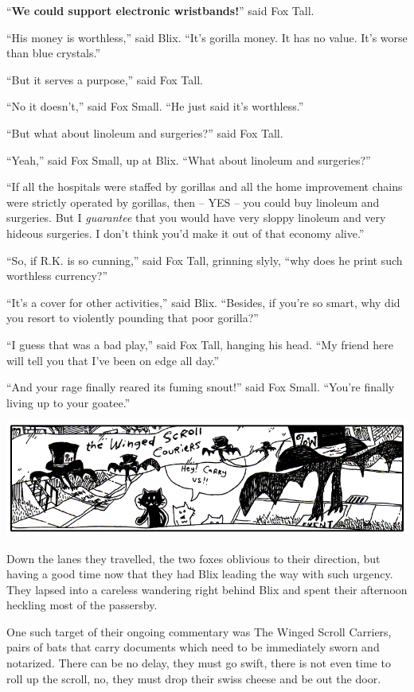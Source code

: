 \documentclass[10pt,twoside]{report}
\begin{document}
``{\bf We could support electronic wristbands!}'' said Fox Tall.

``His money is worthless,'' said Blix.  ``It's gorilla money.  It has
no value.  It's worse than blue crystals.''

``But it serves a purpose,'' said Fox Tall.

``No it doesn't,'' said Fox Small.  ``He just said it's worthless.''

``But what about linoleum and surgeries?'' said Fox Tall.

``Yeah,'' said Fox Small, up at Blix.  ``What about linoleum and
surgeries?''

``If all the hospitals were staffed by gorillas and all the home
improvement chains were strictly operated by gorillas, then -- YES --
you could buy linoleum and surgeries.  But I {\em guarantee} that you
would have very sloppy linoleum and very hideous surgeries.  I don't
think you'd make it out of that economy alive.''

``So, if R.K. is so cunning,'' said Fox Tall, grinning slyly, ``why
does he print such worthless currency?''

``It's a cover for other activities,'' said Blix.  ``Besides, if
you're so smart, why did you resort to violently pounding that poor
gorilla?''

``I guess that was a bad play,'' said Fox Tall, hanging his head.
``My friend here will tell you that I've been on edge all day.''

``And your rage finally reared its fuming snout!'' said Fox Small.
``You're finally living up to your goatee.''

	\includegraphics[width=1.0\textwidth]{cache/73.png}

Down the lanes they travelled, the two foxes oblivious to their
direction, but having a good time now that they had Blix leading the
way with such urgency.  They lapsed into a careless wandering right
behind Blix and spent their afternoon heckling most of the passersby.

One such target of their ongoing commentary was The Winged Scroll
Carriers, pairs of bats that carry documents which need to be
immediately sworn and notarized.  There can be no delay, they must go
swift, there is not even time to roll up the scroll, no, they must
drop their swiss cheese and be out the door.
\end{document}
